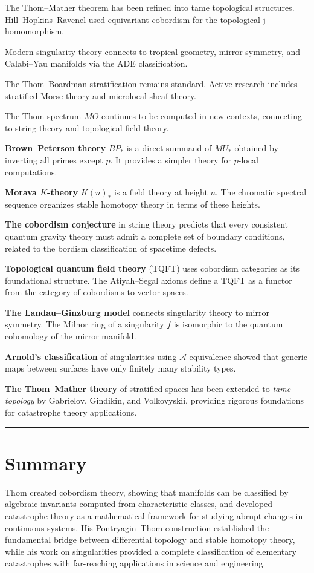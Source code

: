 The Thom--Mather theorem has been refined into tame topological structures.
Hill--Hopkins--Ravenel used equivariant cobordism for the topological
j-homomorphism.

Modern singularity theory connects to tropical geometry, mirror symmetry, and
Calabi--Yau manifolds via the ADE classification.

The Thom--Boardman stratification remains standard. Active research includes
stratified Morse theory and microlocal sheaf theory.

The Thom spectrum $MO$ continues to be computed in new contexts, connecting to
string theory and topological field theory.

\textbf{Brown--Peterson theory} $BP_*$ is a direct summand of $MU_*$ obtained
by inverting all primes except $p$. It provides a simpler theory for $p$-local
computations.

\textbf{Morava $K$-theory} $K(n)_*$ is a field theory at height $n$. The
chromatic spectral sequence organizes stable homotopy theory in terms of these
heights.

\textbf{The cobordism conjecture} in string theory predicts that every consistent
quantum gravity theory must admit a complete set of boundary conditions, related
to the bordism classification of spacetime defects.

\textbf{Topological quantum field theory} (TQFT) uses cobordism categories as
its foundational structure. The Atiyah--Segal axioms define a TQFT as a
functor from the category of cobordisms to vector spaces.

\textbf{The Landau--Ginzburg model} connects singularity theory to mirror
symmetry. The Milnor ring of a singularity $f$ is isomorphic to the quantum
cohomology of the mirror manifold.

\textbf{Arnold's classification} of singularities using $\mathcal{A}$-equivalence
showed that generic maps between surfaces have only finitely many stability
types.

\textbf{The Thom--Mather theory} of stratified spaces has been extended to
\emph{tame topology} by Gabrielov, Gindikin, and Volkovyskii, providing
rigorous foundations for catastrophe theory applications.

\begin{center}\rule{0.5\linewidth}{0.5pt}\end{center}

\section*{Summary}

Thom created cobordism theory, showing that manifolds can be classified by
algebraic invariants computed from characteristic classes, and developed
catastrophe theory as a mathematical framework for studying abrupt changes in
continuous systems. His Pontryagin--Thom construction established the fundamental
bridge between differential topology and stable homotopy theory, while his
work on singularities provided a complete classification of elementary
catastrophes with far-reaching applications in science and engineering.
